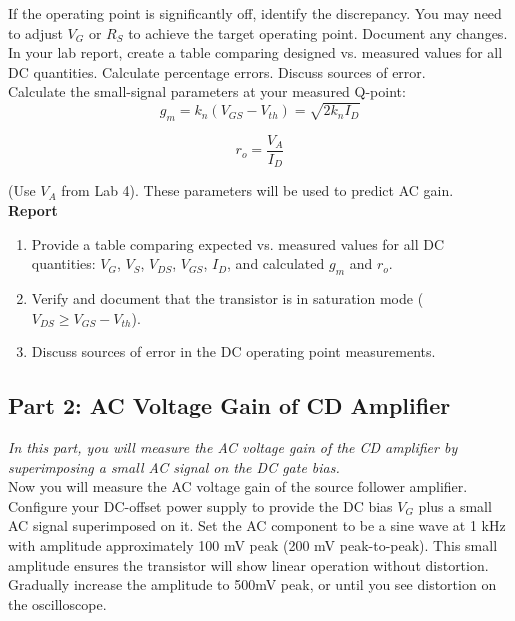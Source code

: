 \documentclass[10pt]{article}
\begin{document}
If the operating point is significantly off, identify the discrepancy. You may need to adjust $V_G$ or $R_S$ to achieve the target operating point. Document any changes. \\

In your lab report, create a table comparing designed vs. measured values for all DC quantities. Calculate percentage errors.  Discuss sources of error. \\

Calculate the small-signal parameters at your measured Q-point: \\

\begin{equation}
    g_m = k_n (V_{GS} - V_{th}) = \sqrt{2 k_n I_D}
\end{equation}

\begin{equation}
    r_o = \frac{V_A}{I_D}
\end{equation}

(Use $V_A$ from Lab 4). These parameters will be used to predict AC gain.   \\

\textbf{Report}
\begin{enumerate}
    \item Provide a table comparing expected vs. measured values for all DC quantities: $V_G$, $V_S$, $V_{DS}$, $V_{GS}$, $I_D$, and calculated $g_m$ and $r_o$.
    \item Verify and document that the transistor is in saturation mode ($V_{DS} \geq V_{GS} - V_{th}$).
    \item Discuss sources of error in the DC operating point measurements.\\
\end{enumerate}


\subsection{Part 2: AC Voltage Gain of CD Amplifier}

\textit{In this part, you will measure the AC voltage gain of the CD amplifier by superimposing a small AC signal on the DC gate bias.} \\

Now you will measure the AC voltage gain of the source follower amplifier.\\

Configure your DC-offset power supply to provide the DC bias $V_G$ plus a small AC signal superimposed on it. Set the AC component to be a sine wave at 1 kHz with amplitude approximately 100 mV peak (200 mV peak-to-peak). This small amplitude ensures the transistor will show linear operation without distortion.  Gradually increase the amplitude to 500mV peak, or until you see distortion on the oscilloscope.\\
\end{document}
